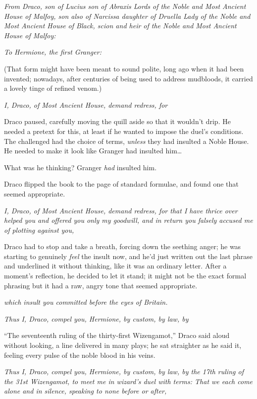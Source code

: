 \emph{From Draco, son of Lucius son of Abraxis Lords of the Noble and
Most Ancient House of Malfoy, son also of Narcissa daughter of Druella
Lady of the Noble and Most Ancient House of Black, scion and heir of the
Noble and Most Ancient House of Malfoy:}

\emph{To Hermione, the first Granger:}

(That form might have been meant to sound polite, long ago when it had
been invented; nowadays, after centuries of being used to address
mudbloods, it carried a lovely tinge of refined venom.)

\emph{I, Draco, of Most Ancient House, demand redress, for}

Draco paused, carefully moving the quill aside so that it wouldn't drip.
He needed a pretext for this, at least if he wanted to impose the duel's
conditions. The challenged had the choice of terms, \emph{unless} they
had insulted a Noble House. He needed to make it look like Granger had
insulted him\ldots{}

What was he thinking? Granger \emph{had} insulted him.

Draco flipped the book to the page of standard formulae, and found one
that seemed appropriate.

\emph{I, Draco, of Most Ancient House, demand redress, for that I have
thrice over helped you and offered you only my goodwill, and in return
you falsely accused me of plotting against you,}

Draco had to stop and take a breath, forcing down the seething anger; he
was starting to genuinely \emph{feel} the insult now, and he'd just
written out the last phrase and underlined it without thinking, like it
was an ordinary letter. After a moment's reflection, he decided to let
it stand; it might not be the exact formal phrasing but it had a raw,
angry tone that seemed appropriate.

\emph{which insult you committed before the eyes of Britain.}

\emph{Thus I, Draco, compel you, Hermione, by custom, by law, by}

``The seventeenth ruling of the thirty-first Wizengamot,'' Draco said
aloud without looking, a line delivered in many plays; he sat straighter
as he said it, feeling every pulse of the noble blood in his veins.

\emph{Thus I, Draco, compel you, Hermione, by custom, by law, by the
17th ruling of the 31st Wizengamot, to meet me in wizard's duel with
terms: That we each come alone and in silence, speaking to none before
or after,}

